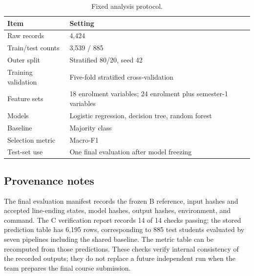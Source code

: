 \begin{table}[H]
\centering
\caption{Fixed analysis protocol.}
\begin{tabular}{ll}
\toprule
Item & Setting \\
\midrule
Raw records & 4,424 \\
Train/test counts & 3,539 / 885 \\
Outer split & Stratified 80/20, seed 42 \\
Training validation & Five-fold stratified cross-validation \\
Feature sets & 18 enrolment variables; 24 enrolment plus semester-1 variables \\
Models & Logistic regression, decision tree, random forest \\
Baseline & Majority class \\
Selection metric & Macro-F1 \\
Test-set use & One final evaluation after model freezing \\
\bottomrule
\end{tabular}
\end{table}

\subsection{Provenance notes}

The final evaluation manifest records the frozen B reference, input hashes and accepted line-ending
states, model hashes, output hashes, environment, and command. The C verification report records
14 of 14 checks passing; the stored prediction table has 6,195 rows, corresponding to 885 test
students evaluated by seven pipelines including the shared baseline. The metric table can be
recomputed from those predictions. These checks verify internal consistency of the recorded
outputs; they do not replace a future independent run when the team prepares the final course
submission.

